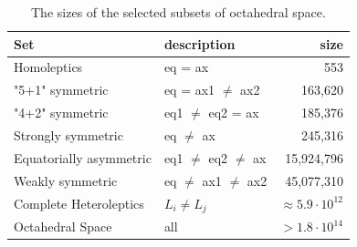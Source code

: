 \begin{table}[]
	\centering
	\caption{The sizes of the selected subsets of octahedral space.}
	\label{tab:space-sizes}
	\begin{tabular}{llr}
		\toprule
		Set 					& description		    	   & size \\
		\midrule
		Homoleptics             & eq = ax                   & 553        \\[0.1cm]
		"5+1" symmetric         & eq = ax1 $\neq$ ax2       & 163,620    \\[0.1cm]
		"4+2" symmetric         & eq1 $\neq$ eq2 = ax       & 185,376    \\[0.1cm]
		Strongly symmetric      & eq $\neq$ ax              & 245,316    \\[0.1cm]
		Equatorially asymmetric & eq1 $\neq$ eq2 $\neq$ ax  & 15,924,796 \\[0.1cm]
		Weakly symmetric        & eq $\neq$ ax1 $\neq$ ax2  & 45,077,310 \\[0.1cm]
		Complete Heteroleptics  & $L_i \neq L_j$            & $\approx 5.9 \cdot 10^{12}$ \\[0.1cm] %
		Octahedral Space        & all                       & $> 1.8 \cdot 10^{14}$ \\
		\bottomrule
	\end{tabular}
\end{table}





